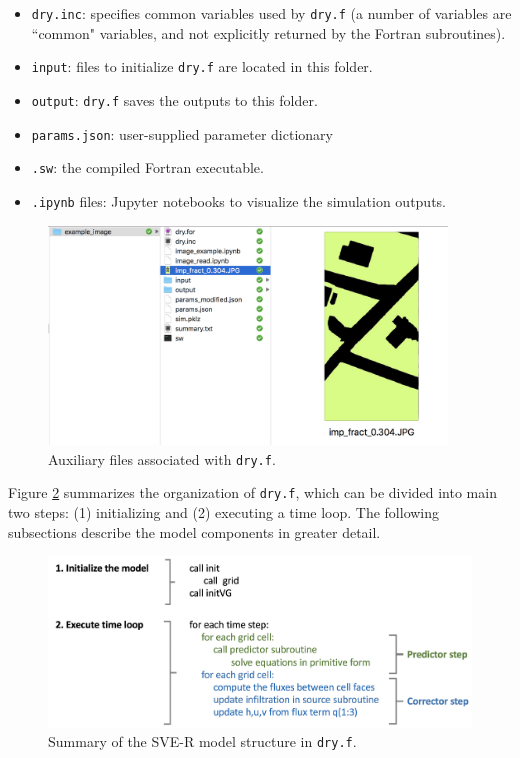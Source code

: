 \documentclass{article}
\newcommand{\code}[1]{\texttt{#1}}
\begin{document}
\begin{itemize}
	\item \code{\code{dry.inc}}: specifies common variables used by \code{dry.f}  (a number of variables are ``common" variables, and not explicitly returned by the Fortran subroutines). 
	\item \code{input}:  files to initialize \code{dry.f} are located in this folder.
	\item \code{output}: \code{dry.f} saves the outputs to this folder.	
	\item \code{params.json}: user-supplied parameter dictionary
	\item \code{.sw}: the compiled Fortran executable.
	\item \code{.ipynb} files: Jupyter notebooks to visualize the simulation outputs.
\end{itemize}
 


 \begin{figure}[h]
 \centering
\includegraphics[width=25pc]{grid/files.png}
 \caption{Auxiliary files associated with \code{dry.f}.}
 \label{files}
 \end{figure}


Figure \ref{summary} summarizes the organization of \code{dry.f}, which can be divided into main two steps: (1) initializing and (2) executing a time loop.   The following subsections describe the model components in greater detail.


\begin{figure}[h]
 \centering
\includegraphics[width=30pc]{grid/summary.png}
 \caption{Summary of the SVE-R model structure in \code{dry.f}.}
 \label{summary}
 \end{figure}
\end{document}
